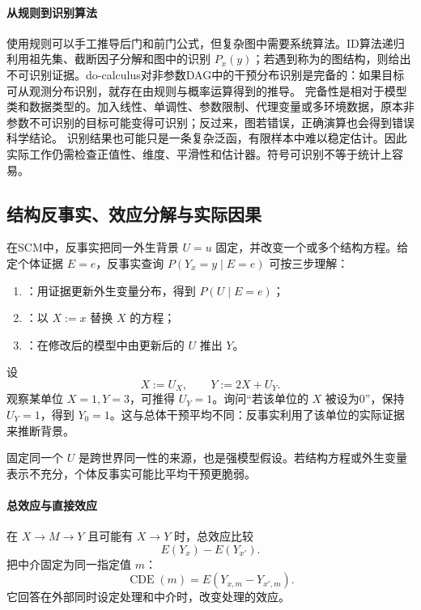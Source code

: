 \paragraph{从规则到识别算法}

使用规则可以手工推导后门和前门公式，但复杂图中需要系统算法。ID算法递归利用祖先集、截断因子分解和图中的识别 $P_x(y)$；若遇到称为的图结构，则给出不可识别证据\parencite{shpitserpearl2006}。do-calculus对非参数DAG中的干预分布识别是完备的：如果目标可从观测分布识别，就存在由规则与概率运算得到的推导。
完备性是相对于模型类和数据类型的。加入线性、单调性、参数限制、代理变量或多环境数据，原本非参数不可识别的目标可能变得可识别；反过来，图若错误，正确演算也会得到错误科学结论。
识别结果也可能只是一条复杂泛函，有限样本中难以稳定估计。因此实际工作仍需检查正值性、维度、平滑性和估计器。符号可识别不等于统计上容易。

\subsection{结构反事实、效应分解与实际因果}

在SCM中，反事实把同一外生背景 $U=u$ 固定，并改变一个或多个结构方程。给定个体证据 $E=e$，反事实查询 $P(Y_x=y\mid E=e)$ 可按三步理解：

\begin{enumerate}
  \item {}：用证据更新外生变量分布，得到 $P(U\mid E=e)$；
  \item {}：以 $X:=x$ 替换 $X$ 的方程；
  \item {}：在修改后的模型中由更新后的 $U$ 推出 $Y$。
\end{enumerate}

设
\[
X:=U_X,\qquad Y:=2X+U_Y.
\]
观察某单位 $X=1,Y=3$，可推得 $U_Y=1$。询问“若该单位的 $X$ 被设为0”，保持 $U_Y=1$，得到 $Y_0=1$。这与总体干预平均不同：反事实利用了该单位的实际证据来推断背景。

固定同一个 $U$ 是跨世界同一性的来源，也是强模型假设。若结构方程或外生变量表示不充分，个体反事实可能比平均干预更脆弱。

\paragraph{总效应与直接效应}

在 $X\rightarrow M\rightarrow Y$ 且可能有 $X\rightarrow Y$ 时，总效应比较
\[
E(Y_x)-E(Y_{x'}).
\]
把中介固定为同一指定值 $m$：
\[
\operatorname{CDE}(m)=E(Y_{x,m}-Y_{x',m}).
\]
它回答在外部同时设定处理和中介时，改变处理的效应。

